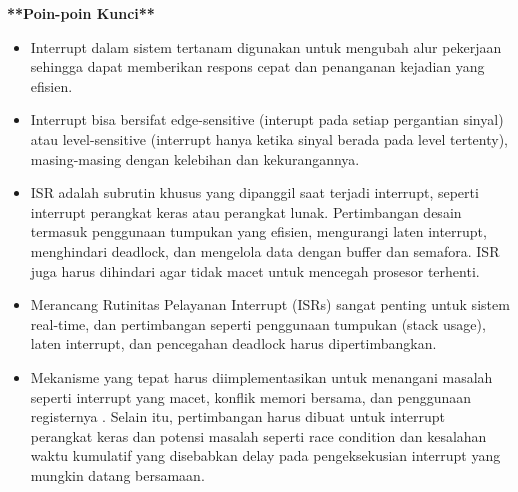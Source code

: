 \documentclass{article}
\begin{document}
\smallbreak
\textbf{**Poin-poin Kunci**}
\begin{itemize}
     
    \item Interrupt dalam sistem tertanam digunakan untuk mengubah alur pekerjaan sehingga dapat  memberikan respons cepat dan penanganan kejadian yang efisien. 
    \item Interrupt bisa bersifat edge-sensitive (interupt pada setiap pergantian sinyal) atau level-sensitive (interrupt hanya ketika sinyal berada pada level tertenty), masing-masing dengan kelebihan dan kekurangannya.
    
    \item ISR adalah subrutin khusus yang dipanggil saat terjadi interrupt, seperti interrupt perangkat keras atau perangkat lunak. Pertimbangan desain termasuk penggunaan tumpukan yang efisien, mengurangi laten interrupt, menghindari deadlock, dan mengelola data dengan buffer dan semafora. ISR juga harus dihindari agar tidak macet untuk mencegah prosesor terhenti.
    \item Merancang Rutinitas Pelayanan Interrupt (ISRs) sangat penting untuk sistem real-time, dan pertimbangan seperti penggunaan tumpukan (stack usage), laten interrupt, dan pencegahan deadlock harus dipertimbangkan.
    \item Mekanisme yang tepat harus diimplementasikan untuk menangani masalah seperti interrupt yang macet, konflik memori bersama, dan penggunaan registernya . Selain itu, pertimbangan harus dibuat untuk interrupt perangkat keras dan potensi masalah seperti race condition dan kesalahan waktu kumulatif yang disebabkan delay pada pengeksekusian interrupt yang mungkin datang bersamaan.
    
\end{itemize}    
\end{document}
